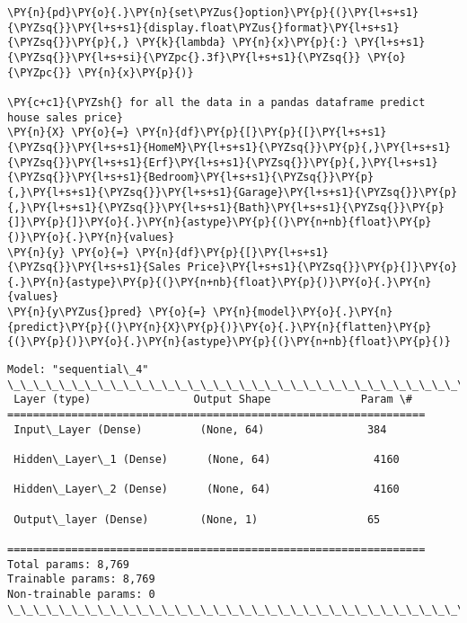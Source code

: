 \begin{tcolorbox}[breakable, size=fbox, boxrule=1pt, pad at break*=1mm,colback=cellbackground, colframe=cellborder]
\begin{Verbatim}[commandchars=\\\{\}]
\PY{n}{pd}\PY{o}{.}\PY{n}{set\PYZus{}option}\PY{p}{(}\PY{l+s+s1}{\PYZsq{}}\PY{l+s+s1}{display.float\PYZus{}format}\PY{l+s+s1}{\PYZsq{}}\PY{p}{,} \PY{k}{lambda} \PY{n}{x}\PY{p}{:} \PY{l+s+s1}{\PYZsq{}}\PY{l+s+si}{\PYZpc{}.3f}\PY{l+s+s1}{\PYZsq{}} \PY{o}{\PYZpc{}} \PY{n}{x}\PY{p}{)}

\PY{c+c1}{\PYZsh{} for all the data in a pandas dataframe predict house sales price}
\PY{n}{X} \PY{o}{=} \PY{n}{df}\PY{p}{[}\PY{p}{[}\PY{l+s+s1}{\PYZsq{}}\PY{l+s+s1}{HomeM}\PY{l+s+s1}{\PYZsq{}}\PY{p}{,}\PY{l+s+s1}{\PYZsq{}}\PY{l+s+s1}{Erf}\PY{l+s+s1}{\PYZsq{}}\PY{p}{,}\PY{l+s+s1}{\PYZsq{}}\PY{l+s+s1}{Bedroom}\PY{l+s+s1}{\PYZsq{}}\PY{p}{,}\PY{l+s+s1}{\PYZsq{}}\PY{l+s+s1}{Garage}\PY{l+s+s1}{\PYZsq{}}\PY{p}{,}\PY{l+s+s1}{\PYZsq{}}\PY{l+s+s1}{Bath}\PY{l+s+s1}{\PYZsq{}}\PY{p}{]}\PY{p}{]}\PY{o}{.}\PY{n}{astype}\PY{p}{(}\PY{n+nb}{float}\PY{p}{)}\PY{o}{.}\PY{n}{values}
\PY{n}{y} \PY{o}{=} \PY{n}{df}\PY{p}{[}\PY{l+s+s1}{\PYZsq{}}\PY{l+s+s1}{Sales Price}\PY{l+s+s1}{\PYZsq{}}\PY{p}{]}\PY{o}{.}\PY{n}{astype}\PY{p}{(}\PY{n+nb}{float}\PY{p}{)}\PY{o}{.}\PY{n}{values}
\PY{n}{y\PYZus{}pred} \PY{o}{=} \PY{n}{model}\PY{o}{.}\PY{n}{predict}\PY{p}{(}\PY{n}{X}\PY{p}{)}\PY{o}{.}\PY{n}{flatten}\PY{p}{(}\PY{p}{)}\PY{o}{.}\PY{n}{astype}\PY{p}{(}\PY{n+nb}{float}\PY{p}{)}
\end{Verbatim}
\end{tcolorbox}

    \begin{Verbatim}[commandchars=\\\{\}]
Model: "sequential\_4"
\_\_\_\_\_\_\_\_\_\_\_\_\_\_\_\_\_\_\_\_\_\_\_\_\_\_\_\_\_\_\_\_\_\_\_\_\_\_\_\_\_\_\_\_\_\_\_\_\_\_\_\_\_\_\_\_\_\_\_\_\_\_\_\_\_
 Layer (type)                Output Shape              Param \#
=================================================================
 Input\_Layer (Dense)         (None, 64)                384

 Hidden\_Layer\_1 (Dense)      (None, 64)                4160

 Hidden\_Layer\_2 (Dense)      (None, 64)                4160

 Output\_layer (Dense)        (None, 1)                 65

=================================================================
Total params: 8,769
Trainable params: 8,769
Non-trainable params: 0
\_\_\_\_\_\_\_\_\_\_\_\_\_\_\_\_\_\_\_\_\_\_\_\_\_\_\_\_\_\_\_\_\_\_\_\_\_\_\_\_\_\_\_\_\_\_\_\_\_\_\_\_\_\_\_\_\_\_\_\_\_\_\_\_\_
    \end{Verbatim}

